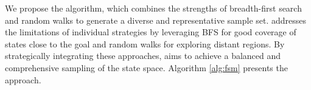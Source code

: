 We propose the \bfsrw algorithm, which combines the strengths of breadth-first search and random walks to generate a diverse and representative sample set. \bfsrw addresses the limitations of individual strategies by leveraging BFS for good coverage of states close to the goal and random walks for exploring distant regions. By strategically integrating these approaches, \bfsrw aims to achieve a balanced and comprehensive sampling of the state space. Algorithm \ref{alg:fsm} presents the approach.

\begin{algorithm}[h]
    \SetAlgoLined



\end{algorithm}
